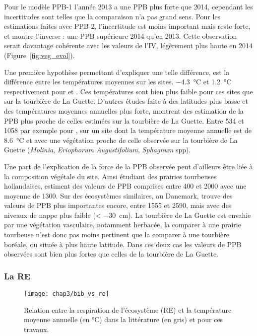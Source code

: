 Pour le modèle PPB-1 l'année 2013 a une PPB plus forte que 2014, cependant les incertitudes sont telles que la comparaison n'a pas grand sens.
Pour les estimations faites avec PPB-2, l'incertitude est moins important mais reste forte, et montre l'inverse : une PPB supérieure 2014 qu'en 2013.
Cette observation serait davantage cohérente avec les valeurs de l'IV, légèrement plus haute en 2014 (Figure~\ref{fig:veg_evol}).

Une première hypothèse permettant d'expliquer une telle différence, est la différence entre les températures moyennes sur les sites.
\SI{-4.3}{\degreeCelsius} et \SI{1.2}{\degreeCelsius} respectivement pour \citet{trudeau2014} et \citet{peichl2014}.
Ces températures sont bien plus faible pour ces sites que sur la tourbière de La Guette.
D'autres études faite à des latitudes plus basse et des températures moyennes annuelles plus forte, montrent des estimation de la PPB plus proche de celles estimées sur la tourbière de La Guette.
Entre 534 et \SI{1058}{\gcma} par exemple pour \citet{beyer2015}, sur un site dont la température moyenne annuelle est de \SI{8.6}{\degreeCelsius} et avec une végétation proche de celle observée sur la tourbière de La Guette (\textit{Molinia}, \textit{Eriophorum Augustifolium}, \textit{Sphagnum} spp).

Une part de l'explication de la force de la PPB observée peut d'ailleurs être liée à la composition végétale du site.
Ainsi \citet{jacobs2007} étudiant des prairies tourbeuses hollandaises, estiment des valeurs de PPB comprises entre 400 et \SI{2000}{\gcma} avec une moyenne de \SI{1300}{\gcma}.
Sur des écosystèmes similaires, au Danemark, \citet{gorres2014} trouve des valeurs de PPB plus importantes encore, entre 1555 et \SI{2590}{\gcma}, mais avec des niveaux de nappe plus faible (< \SI{-30}{\centi\metre}).
La tourbière de La Guette est envahie par une végétation vasculaire, notamment herbacée, la comparer à une prairie tourbeuse n'est donc pas moins pertinent que la comparer à une tourbière boréale, ou située à plus haute latitude.
Dans ces deux cas les valeurs de PPB observées sont bien plus fortes que celles de la tourbière de La Guette.

\subsubsection{La RE}

\begin{figure}
\centering
\texttt{[image: chap3/bib\_vs\_re]}
\caption{Relation entre la respiration de l'écosystème (RE) et la température moyenne annuelle (en °C) dans la littérature (en gris) et pour ces travaux.}
\label{fig:bib_vs_re}
\end{figure}

